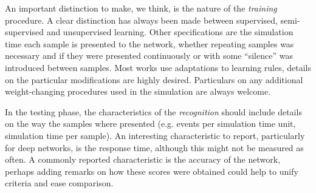 An important distinction to make, we think, is the nature of the \emph{training} procedure. A clear distinction has always been made between supervised, semi-supervised and unsupervised learning. Other specifications are the simulation time each sample is presented to the network, whether repeating samples was necessary and if they were presented continuously or with some ``silence'' was introduced between samples. Most works use adaptations to learning rules, details on the particular modifications are highly desired. Particulars on any additional weight-changing procedures used in the simulation are always welcome.


In the testing phase, the characteristics of the \emph{recognition} should include details on the way the samples where presented (e.g. events per simulation time unit, simulation time per sample). An interesting characteristic to report, particularly for deep networks, is the response time, although this might not be measured as often. A commonly reported characteristic is the accuracy of the network, perhaps adding remarks on how these scores were obtained could help to unify criteria and ease comparison.







